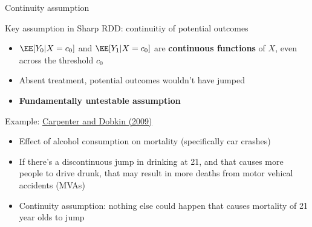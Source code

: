 \documentclass[compress, 8pt]{beamer}
\begin{document}
\begin{frame}{Continuity assumption}

Key assumption in Sharp RDD: continuitiy of potential outcomes
\begin{itemize}
    \item $\EE [Y_0 \vert X = c_0]$ and $\EE [Y_1 \vert X = c_0]$ are \textbf{continuous functions} of $X$, even across the threshold $c_0$
    \item Absent treatment, potential outcomes wouldn't have jumped
    \item \textbf{Fundamentally untestable assumption}
\end{itemize}

\vspace{3ex}
Example: \href{https://doi.org/10.1257/app.1.1.164}{Carpenter and Dobkin (2009)}
\begin{itemize}
    \item Effect of alcohol consumption on mortality (specifically car crashes)
    \item If there's a discontinuous jump in drinking at 21, and that causes more people to drive drunk, that may  result in more deaths from motor vehical accidents (MVAs)
    \item Continuity assumption: nothing else could happen that causes mortality of 21 year olds to jump
\end{itemize}
\end{frame}
\end{document}
